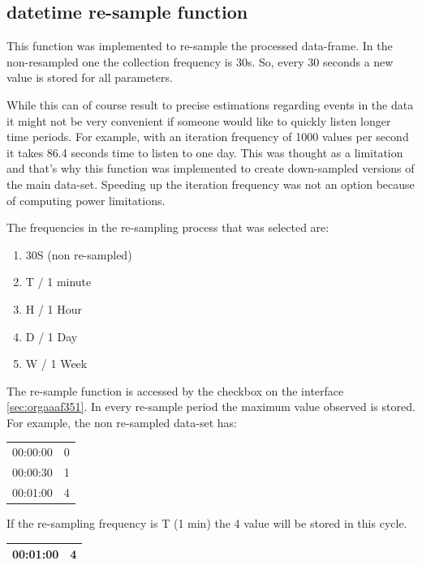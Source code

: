 \documentclass[11pt]{article}
\begin{document}
\subsection{datetime re-sample function}
\label{sec:orgf28435d}

This function was implemented to re-sample the processed data-frame.  In the non-resampled one the collection frequency is 30s. So, every 30 seconds a new value is stored for all parameters.

While this can of course result to precise estimations regarding events in the data it might not be very convenient if someone would like to quickly listen longer time periods.  For example, with an iteration frequency of 1000 values per second it takes 86.4 seconds time to listen to one day.  This was thought as a limitation and that's why this function was implemented to create down-sampled versions of the main data-set.  Speeding up the iteration frequency was not an option because of computing power limitations.

The frequencies in the re-sampling process that was selected are:
\begin{enumerate}
\item 30S (non re-sampled)
\item T / 1 minute
\item H / 1 Hour
\item D / 1 Day
\item W / 1 Week
\end{enumerate}

The re-sample function is accessed by the checkbox on the interface \ref{sec:orgaaaf351}.  In every re-sample period the maximum value observed is stored.  For example, the non re-sampled data-set has:

\begin{center}
\begin{tabular}{rr}
\hline
00:00:00 & 0\\
00:00:30 & 1\\
00:01:00 & 4\\
\hline
\end{tabular}
\end{center}

If the re-sampling frequency is T (1 min) the 4 value will be stored in this cycle.

\begin{center}
\begin{tabular}{rr}
\hline
00:01:00 & 4\\
\hline
\end{tabular}
\end{center}
\end{document}
